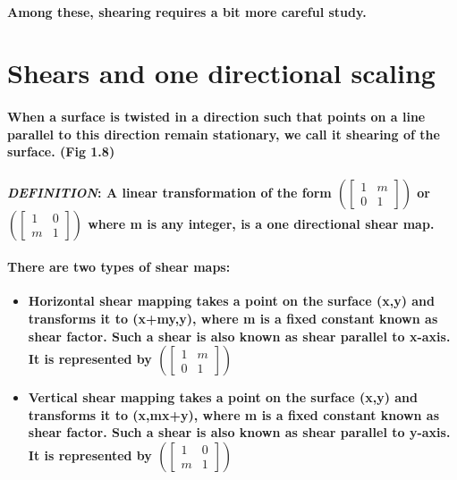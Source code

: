 \documentclass{article}
\begin{document}
\paragraph{Among these, shearing requires a bit more careful study.}



\section{Shears and one directional scaling}


\paragraph{When a surface is twisted in a direction such that points on a line parallel to this direction remain stationary, we call it shearing of the surface. (Fig 1.8)}


\paragraph{\textit{DEFINITION}: A linear transformation of the form
$ (\begin{bmatrix}
1&m\\0&1
\end{bmatrix})$
or
$ (\begin{bmatrix}
1&0\\m&1
\end{bmatrix})$
where m is any integer, is a one directional shear map.
}

\paragraph{There are two types of shear maps:}

\begin{itemize}
\item \textbf{Horizontal shear mapping takes a point on the surface (x,y) and transforms it to (x+my,y), where m is a fixed constant known as shear factor. Such a shear is also known as shear parallel to x-axis. It is represented by 
$ (\begin{bmatrix}
1&m\\0&1
\end{bmatrix})$ }

\item \textbf{Vertical shear mapping takes a point on the surface (x,y) and transforms it to (x,mx+y), where m is a fixed constant known as shear factor. Such a shear is also known as shear parallel to y-axis. It is represented by
$ (\begin{bmatrix}
1&0\\m&1
\end{bmatrix})$ }
\end{itemize}
\end{document}
